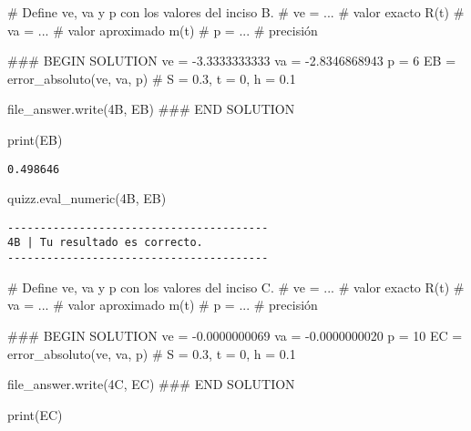 \documentclass[
  letterpaper,
  DIV=11,
  numbers=noendperiod]{scrreprt}
\newenvironment{Shaded}{\begin{snugshade}}{\end{snugshade}}
\newcommand{\BuiltInTok}[1]{\textcolor[rgb]{0.00,0.23,0.31}{#1}}
\newcommand{\CommentTok}[1]{\textcolor[rgb]{0.37,0.37,0.37}{#1}}
\newcommand{\DecValTok}[1]{\textcolor[rgb]{0.68,0.00,0.00}{#1}}
\newcommand{\FloatTok}[1]{\textcolor[rgb]{0.68,0.00,0.00}{#1}}
\newcommand{\NormalTok}[1]{\textcolor[rgb]{0.00,0.23,0.31}{#1}}
\newcommand{\OperatorTok}[1]{\textcolor[rgb]{0.37,0.37,0.37}{#1}}
\newcommand{\RegionMarkerTok}[1]{\textcolor[rgb]{0.00,0.23,0.31}{#1}}
\newcommand{\StringTok}[1]{\textcolor[rgb]{0.13,0.47,0.30}{#1}}
\begin{document}
\begin{Shaded}
\begin{Highlighting}[]
\CommentTok{\# Define ve, va y p con los valores del inciso B.}
\CommentTok{\# ve = ... \# valor exacto R\textquotesingle{}(t) }
\CommentTok{\# va = ... \# valor aproximado m(t)}
\CommentTok{\# p = ...  \# precisión}

\CommentTok{\#\#\# }\RegionMarkerTok{BEGIN}\CommentTok{ SOLUTION}
\NormalTok{ve }\OperatorTok{=} \OperatorTok{{-}}\FloatTok{3.3333333333}
\NormalTok{va }\OperatorTok{=} \OperatorTok{{-}}\FloatTok{2.8346868943}
\NormalTok{p }\OperatorTok{=} \DecValTok{6}
\NormalTok{EB }\OperatorTok{=}\NormalTok{ error\_absoluto(ve, va, p) }\CommentTok{\# S = 0.3, t = 0, h = 0.1}

\NormalTok{file\_answer.write(}\StringTok{\textquotesingle{}4B\textquotesingle{}}\NormalTok{, EB)}
\CommentTok{\#\#\# }\RegionMarkerTok{END}\CommentTok{ SOLUTION}

\BuiltInTok{print}\NormalTok{(EB)}
\end{Highlighting}
\end{Shaded}

\begin{verbatim}
0.498646
\end{verbatim}

\begin{Shaded}
\begin{Highlighting}[]
\NormalTok{quizz.eval\_numeric(}\StringTok{\textquotesingle{}4B\textquotesingle{}}\NormalTok{, EB)}
\end{Highlighting}
\end{Shaded}

\begin{verbatim}
----------------------------------------
4B | Tu resultado es correcto.
----------------------------------------
\end{verbatim}

\begin{Shaded}
\begin{Highlighting}[]
\CommentTok{\# Define ve, va y p con los valores del inciso C.}
\CommentTok{\# ve = ... \# valor exacto R\textquotesingle{}(t) }
\CommentTok{\# va = ... \# valor aproximado m(t)}
\CommentTok{\# p = ...  \# precisión}

\CommentTok{\#\#\# }\RegionMarkerTok{BEGIN}\CommentTok{ SOLUTION}
\NormalTok{ve }\OperatorTok{=} \OperatorTok{{-}}\FloatTok{0.0000000069}
\NormalTok{va }\OperatorTok{=} \OperatorTok{{-}}\FloatTok{0.0000000020}
\NormalTok{p }\OperatorTok{=} \DecValTok{10}
\NormalTok{EC }\OperatorTok{=}\NormalTok{ error\_absoluto(ve, va, p) }\CommentTok{\# S = 0.3, t = 0, h = 0.1}

\NormalTok{file\_answer.write(}\StringTok{\textquotesingle{}4C\textquotesingle{}}\NormalTok{, EC)}
\CommentTok{\#\#\# }\RegionMarkerTok{END}\CommentTok{ SOLUTION}

\BuiltInTok{print}\NormalTok{(EC)}
\end{Highlighting}
\end{Shaded}
\end{document}
